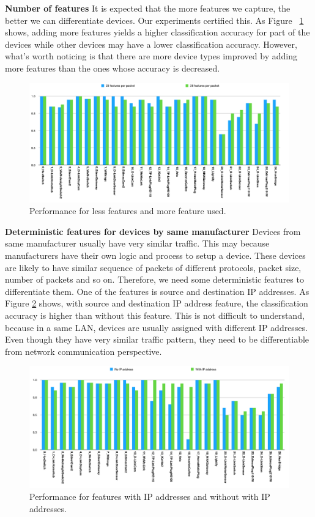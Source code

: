 \documentclass[twocolumn,10pt]{article}
\begin{document}
\textbf{Number of features}
It is expected that the more features we capture, the better we can differentiate devices. Our experiments certified this. As Figure ~\ref{fig: res2} shows, adding more features yields a higher classification accuracy for part of the devices while other devices may have a lower classification accuracy. However, what's worth noticing is that there are more device types improved by adding more features than the ones whose accuracy is decreased.

\begin{figure}[h]
  \centering
   \includegraphics[scale=0.28]{res2}
  \caption{Performance for less features and more feature used.}
  \label{fig: res2}
\end{figure}

\textbf{Deterministic features for devices by same manufacturer}
Devices from same manufacturer usually have very similar traffic. This may because manufacturers have their own logic and process to setup a device. These devices are likely to have similar sequence of packets of different protocols, packet size, number of packets and so on. Therefore, we need some deterministic features to differentiate them. One of the features is source and destination IP addresses. As Figure \ref{fig: res3} shows, with source and destination IP address feature, the classification accuracy is higher than without this feature. This is not difficult to understand, because in a same LAN, devices are usually assigned with different IP addresses. Even though they have very similar traffic pattern, they need to be differentiable from network communication perspective.



\begin{figure}[h]
  \centering
   \includegraphics[scale=0.3]{res3}
  \caption{Performance for features with IP addresses and without with IP addresses.}
  \label{fig: res3}
\end{figure}
\end{document}
